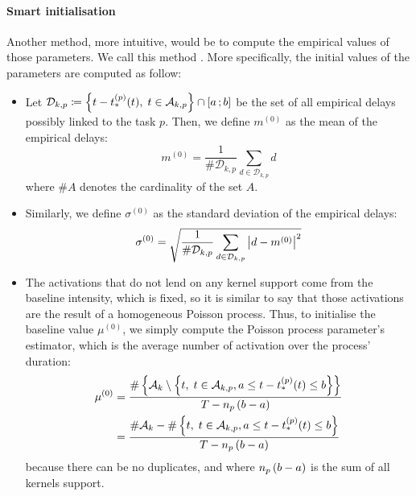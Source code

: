 \paragraph{Smart initialisation}
Another method, more intuitive, would be to compute the empirical values of those parameters.
We call this method .
More specifically, the initial values of the parameters are computed as follow:
\begin{itemize}
     \item Let $\mathcal{D}_{k,p} \coloneqq \left\lbrace t-t_*^{(p)}(t),\; t\in\mathcal{A}_{k,p} \right\rbrace \cap \left[ a \, ; b \right]$ be the set of all empirical delays possibly linked to the task $p$.
    Then, we define $m^{(0)}$ as the mean of the empirical delays:
    \begin{equation}
        m^{(0)} = \frac{1}{\#\mathcal{D}_{k,p}}\sum_{d \in \mathcal{D}_{k,p}} d
    \end{equation}
    where $\# A$ denotes the cardinality of the set $A$.
    
    \item Similarly, we define $\sigma^{(0)}$ as the standard deviation of the empirical delays:
    \begin{equation}
        \sigma^{(0)} = \sqrt{\frac{1}{\#\mathcal{D}_{k,p}}\sum_{d \in \mathcal{D}_{k,p}} \left\vert d - m^{(0)}\right\vert^2}
    \end{equation}
    
    \item The activations that do not lend on any kernel support come from the baseline intensity, which is fixed, so it is similar to say that those activations are the result of a homogeneous Poisson process.
    Thus, to initialise the baseline value $\mu^{(0)}$, we simply compute the Poisson process parameter's estimator, which is the average number of activation over the process' duration:
    \begin{equation}\label{eq:baseline_init}
    \begin{split}
        \mu^{(0)} &= \frac{\#\left\lbrace \mathcal{A}_k \setminus \left\lbrace t,\; t\in\mathcal{A}_{k,p}, a\leq t-t_*^{(p)}(t)\leq b \right\rbrace \right\rbrace}{T - n_p\left( b-a \right)} \\
        &= \frac{\#\mathcal{A}_k - \#\left\lbrace t,\; t\in\mathcal{A}_{k,p}, a\leq t-t_*^{(p)}(t)\leq b \right\rbrace}{T- n_p\left( b-a \right)}
    \end{split}
    \end{equation}
    because there can be no duplicates, and where $n_p\left( b-a \right)$ is the sum of all kernels support.
    

\end{itemize}
